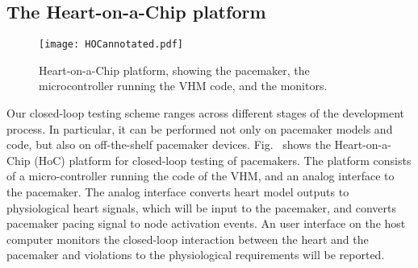 \subsection{The Heart-on-a-Chip platform}
\label{HoC}

\begin{figure}[!t]
	\centering
	\texttt{[image: HOCannotated.pdf]}		
	\caption{\small Heart-on-a-Chip platform, showing the pacemaker, the microcontroller running the VHM code, and the monitors.}
	\label{fig:hoc}
\end{figure} 

Our closed-loop testing scheme ranges across different stages of the development process. 
In particular, it can be performed not only on pacemaker models and code, but also on off-the-shelf pacemaker devices. Fig.~ shows the Heart-on-a-Chip (HoC) platform for closed-loop testing of pacemakers. 
The platform consists of a micro-controller running the code of the VHM, and an analog interface to the pacemaker. The analog interface converts heart model outputs to physiological heart signals, which will be input to the pacemaker, and converts pacemaker pacing signal to node activation events.  An user interface on the host computer monitors the closed-loop interaction between the heart and the pacemaker and violations to the physiological requirements will be reported.
